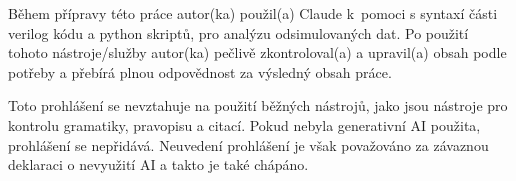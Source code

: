 
Během přípravy této práce autor(ka) použil(a) Claude k pomoci s syntaxí části verilog kódu a python skriptů, pro analýzu odsimulovaných dat. Po použití tohoto nástroje/služby autor(ka) pečlivě zkontroloval(a) a upravil(a) obsah podle potřeby a přebírá plnou odpovědnost za výsledný obsah práce.


Toto prohlášení se nevztahuje na použití běžných nástrojů, jako jsou nástroje pro kontrolu gramatiky, pravopisu a citací. Pokud nebyla generativní AI použita, prohlášení se nepřidává. Neuvedení prohlášení je však považováno za závaznou deklaraci o nevyužití AI a takto je také chápáno.